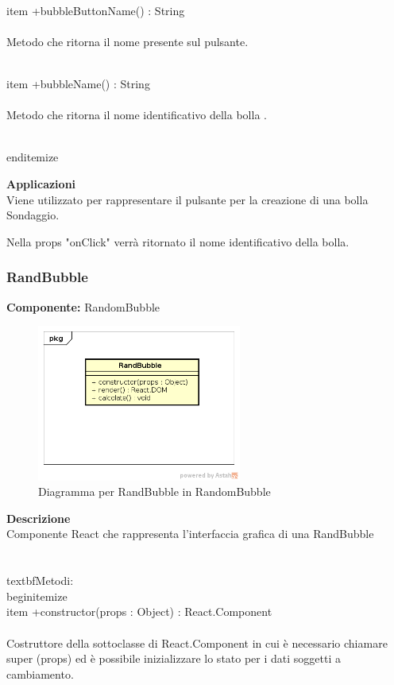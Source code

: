 \\item +bubbleButtonName() : String 
\\\\
Metodo che ritorna il nome presente sul pulsante.

\\item +bubbleName() : String 
\\\\
Metodo che ritorna il nome identificativo della bolla .

\\end{itemize} 


\textbf{Applicazioni}\\
Viene utilizzato per rappresentare il pulsante per la creazione di una bolla Sondaggio.

Nella props "onClick" verrà ritornato il nome identificativo della bolla. 


\clearpage

\subsubsection{RandBubble}
\textbf{Componente:}  RandomBubble\\
   \FloatBarrier
   \begin{figure}[ht]
   \centering
   \includegraphics[width=0.6\textwidth]{img/single-RandBubble}
   \caption{{Diagramma per RandBubble in RandomBubble}}
\end{figure}
\FloatBarrier
\textbf{Descrizione}\\
Componente React che rappresenta l'interfaccia grafica di una RandBubble
\\\\
\\textbf{Metodi:} 
\\begin{itemize}
\\item +constructor(props : Object) : React.Component 
\\\\
Costruttore della sottoclasse di React.Component in cui è necessario chiamare super (props) ed è possibile inizializzare lo stato per i dati soggetti a cambiamento. 

